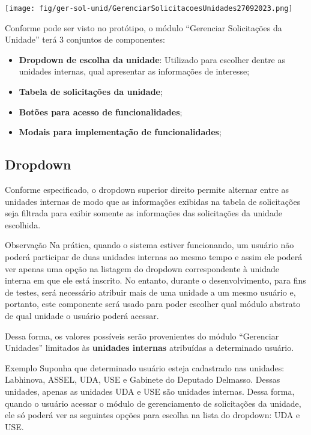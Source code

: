 	\begin{center}
		\texttt{[image: fig/ger-sol-unid/GerenciarSolicitacoesUnidades27092023.png]}
	\end{center}

	Conforme pode ser visto no protótipo, o módulo ``Gerenciar Solicitações da Unidade'' terá 3 conjuntos de componentes:
	
	\begin{itemize}
		\item \textbf{Dropdown de escolha da unidade}: Utilizado para escolher dentre as unidades internas, qual apresentar as informações de interesse;
		\item \textbf{Tabela de solicitações da unidade};
		\item \textbf{Botões para acesso de funcionalidades};
		\item \textbf{Modais para implementação de funcionalidades};
	\end{itemize}

	\subsection{Dropdown} 
	
	Conforme especificado, o dropdown superior direito permite alternar entre as unidades internas de modo que as informações exibidas na tabela de solicitações seja filtrada para exibir somente as informações das solicitações da unidade escolhida.
	
	\begin{nota}{Observação}
		Na prática, quando o sistema estiver funcionando, um usuário não poderá participar de duas unidades internas ao mesmo tempo e assim ele poderá ver apenas uma opção na listagem do dropdown correspondente à unidade interna em que ele está inscrito. No entanto, durante o desenvolvimento, para fins de testes, será necessário atribuir mais de uma unidade a um mesmo usuário e, portanto, este componente será usado para poder escolher qual módulo abstrato de qual unidade o usuário poderá acessar. 
	\end{nota}

	Dessa forma, os valores possíveis serão provenientes do módulo ``Gerenciar Unidades'' limitados às \textbf{unidades internas} atribuídas a determinado usuário.
	
	\begin{exemplo}{Exemplo}
		Suponha que determinado usuário esteja cadastrado nas unidades: Labhinova, ASSEL, UDA, USE e Gabinete do Deputado Delmasso. Dessas unidades, apenas as unidades UDA e USE são unidades internas. Dessa forma, quando o usuário acessar o módulo de gerenciamento de solicitações da unidade, ele só poderá ver as seguintes opções para escolha na lista do dropdown: UDA e USE.		
	\end{exemplo}

